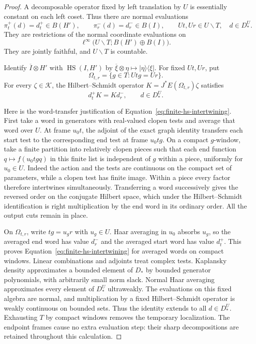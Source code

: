 \begin{proof}
A decomposable operator fixed by left translation by $U$ is essentially
constant on each left coset.  Thus there are normal evaluations
\[
 \pi_t^+(d)=d_t^+\in B(H'),\qquad
 \pi_r^-(d)=d_r^-\in B(I),\qquad Ut,Ur\in U\backslash T,
 \quad d\in D_*^U.
\]
They are restrictions of the normal coordinate evaluations on
\[
 \ell^\infty\bigl(U\backslash T;
                  B(H')\oplus B(I)\bigr).
\]
They are jointly faithful, and $U\backslash T$ is countable.

Identify $\overline I\otimes H'$ with $\operatorname{HS}(I,H')$ by
$\overline\xi\otimes\eta\mapsto |\eta\rangle\langle\xi|$.
For fixed $Ut,Ur$, put
\[
 \Omega_{t,r}=\{g\in T:Utg=Ur\}.
\]
For every $\zeta\in\mathcal K$, the Hilbert--Schmidt operator
$K=J^*E(\Omega_{t,r})\zeta$ satisfies
\begin{equation}
 d_t^+K=Kd_r^-,\qquad d\in D_*^U.
 \label{eq:finite-hs-intertwining}
\end{equation}

Here is the word-transfer justification of
Equation~\eqref{eq:finite-hs-intertwining}.  First take a word in
generators with real-valued clopen tests and average that word over
$U$.  At frame $u_0t$, the adjoint of the exact graph identity transfers
each start test to the corresponding end test at frame $u_0tg$.
On a compact $g$-window, take a finite partition into relatively clopen
pieces such that each end function $q\mapsto f(u_0tgq)$ in this finite
list is independent of $g$ within a piece, uniformly for $u_0\in U$.
Indeed the action and the tests are
continuous on the compact set of parameters, while a clopen test has
finite image.  Within a piece every factor therefore intertwines
simultaneously.  Transferring a word successively gives the reversed
order on the conjugate Hilbert space, which under the Hilbert--Schmidt
identification is right multiplication by the end word in its ordinary
order.  All the output cuts remain in place.

On $\Omega_{t,r}$, write $tg=u_g r$ with $u_g\in U$.  Haar averaging in
$u_0$ absorbs $u_g$, so the averaged end word has value $d_r^-$ and the
averaged start word has value $d_t^+$.  This proves
Equation~\eqref{eq:finite-hs-intertwining} for averaged words on compact
windows.  Linear combinations and adjoints treat complex tests.
Kaplansky density approximates a bounded element of $D_*$ by bounded
generator polynomials, with arbitrarily small norm slack.  Normal Haar
averaging approximates every element of $D_*^U$ ultraweakly.
The evaluations on this fixed algebra are normal, and multiplication
by a fixed Hilbert--Schmidt operator is weakly continuous on bounded
sets.  Thus the identity extends to all $d\in D_*^U$.
Exhausting $T$ by compact windows removes the temporary localization.
The endpoint frames cause no extra evaluation step: their sharp
decompositions are retained throughout this calculation.


\end{proof}
